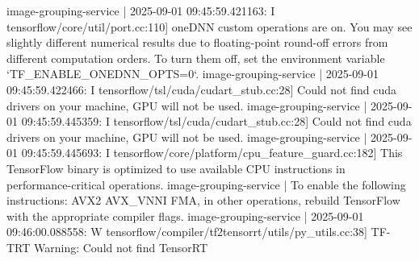 image-grouping-service  | 2025-09-01 09:45:59.421163: I tensorflow/core/util/port.cc:110] oneDNN custom operations are on. You may see slightly different numerical results due to floating-point round-off errors from different computation orders. To turn them off, set the environment variable `TF_ENABLE_ONEDNN_OPTS=0`.
image-grouping-service  | 2025-09-01 09:45:59.422466: I tensorflow/tsl/cuda/cudart_stub.cc:28] Could not find cuda drivers on your machine, GPU will not be used.
image-grouping-service  | 2025-09-01 09:45:59.445359: I tensorflow/tsl/cuda/cudart_stub.cc:28] Could not find cuda drivers on your machine, GPU will not be used.
image-grouping-service  | 2025-09-01 09:45:59.445693: I tensorflow/core/platform/cpu_feature_guard.cc:182] This TensorFlow binary is optimized to use available CPU instructions in performance-critical operations.
image-grouping-service  | To enable the following instructions: AVX2 AVX_VNNI FMA, in other operations, rebuild TensorFlow with the appropriate compiler flags.
image-grouping-service  | 2025-09-01 09:46:00.088558: W tensorflow/compiler/tf2tensorrt/utils/py_utils.cc:38] TF-TRT Warning: Could not find TensorRT




















